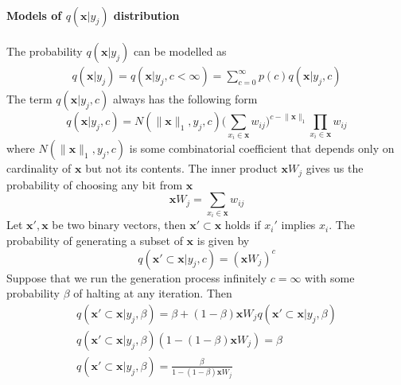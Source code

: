 \documentclass[12pt]{article}
\begin{document}
 \paragraph{Models of $q(\boldsymbol{x}|y_j)$ distribution}
 The probability $q(\boldsymbol{x}|y_j)$ can be modelled as
 \begin{gather*} 
q(\boldsymbol{x}|y_j) = q(\boldsymbol{x}|y_j,c<\infty) = \sum_{c=0}^{\infty} p(c) q(\boldsymbol{x}|y_j,c)
 \end{gather*}
The term $q(\boldsymbol{x}|y_j,c)$ always has the following form
\[
q(\boldsymbol{x}|y_j,c) = N(\lVert\boldsymbol{x} \rVert_1 ,y_j,c)\big(\sum_{x_i\in\boldsymbol{x}} w_{ij}\big)^{ c - \lVert\boldsymbol{x} \rVert_1  }\prod_{x_i\in\boldsymbol{x}} w_{ij}
\]
where $N(\lVert\boldsymbol{x} \rVert_1 ,y_j,c)$ is some combinatorial coefficient that depends only on cardinality of $\boldsymbol{x}$ but not its contents. The inner product  $\boldsymbol{x}W_j$ gives us the probability of choosing any bit from $\boldsymbol{x}$
\[
\boldsymbol{x}W_j = \sum_{x_i\in\boldsymbol{x}} w_{ij}
\]
Let $\boldsymbol{x}', \boldsymbol{x}$ be two binary vectors, then $\boldsymbol{x}' \subset \boldsymbol{x}$ holds if $x_i'$ implies $x_i$. The probability of generating a subset of $\boldsymbol{x}$ is given by
\[
q(\boldsymbol{x}' \subset \boldsymbol{x}|y_j,c) = (\boldsymbol{x}W_j)^c
\]
Suppose that we run the generation process infinitely  $c=\infty$ with some probability $\beta$ of halting at any iteration. Then 
\begin{gather*}
q(\boldsymbol{x}' \subset \boldsymbol{x}|y_j,\beta) = \beta + (1-\beta)\boldsymbol{x}W_j q(\boldsymbol{x}' \subset \boldsymbol{x}|y_j,\beta) \\
q(\boldsymbol{x}' \subset \boldsymbol{x}|y_j,\beta)(1-(1-\beta)\boldsymbol{x}W_j ) = \beta \\
q(\boldsymbol{x}' \subset \boldsymbol{x}|y_j,\beta) = \frac{\beta}{1-(1-\beta)\boldsymbol{x}W_j } \\
\end{gather*}
\end{document}
